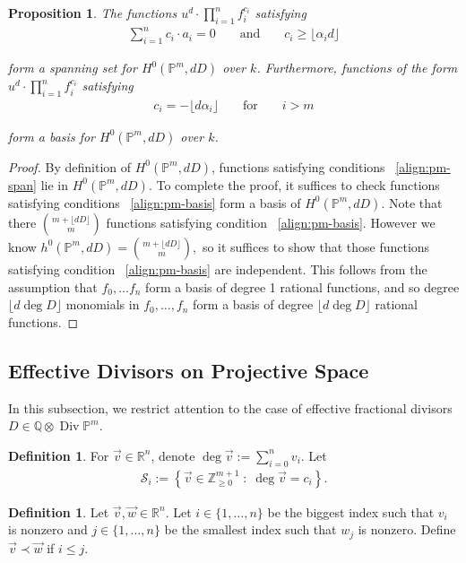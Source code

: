\documentclass{amsart}
\theoremstyle{plain}
\newtheorem{prop}[thm]{Proposition}
\theoremstyle{definition}
\newtheorem{defn}[thm]{Definition}
\theoremstyle{remark}
\numberwithin{equation}{section}
\newcommand\ssec{\subsection}
\newcommand\br{{\mathbb R}}
\newcommand\bq{{\mathbb Q}}
\newcommand\bp{{\mathbb P}}
\newcommand\bz{{\mathbb Z}}
\DeclareMathOperator\di{Div}
\newcommand\bida{a}
\newcommand\mss{\mathscr{S}}
\begin{document}
\begin{prop}
\label{prop:pm-span-and-basis}
The functions $u^d \cdot \prod_{i=1}^n f_i^{c_i}$ satisfying
\begin{align}
\label{align:pm-span}
\sum_{i=1}^{n} c_i \cdot \bida_i = 0 && \text{ and } &&c_i \geq \lfloor \alpha_i d\rfloor	
\end{align}

\noindent
form a spanning set for $H^0(\bp^m, dD)$ over $k$. Furthermore, functions 
of the form $u^d \cdot \prod_{i=1}^n f_i^{c_i}$ satisfying
\begin{align}
\label{align:pm-basis}
c_i = -\lfloor d\alpha_i \rfloor && \text{ for } && i > m
\end{align}

\noindent
form a basis for $H^0(\bp^m, dD)$ over $k$.
\end{prop}

\begin{proof}
By definition of $H^0(\bp^m,dD)$, functions satisfying conditions 
~\eqref{align:pm-span} lie in $H^0(\bp^m,dD)$. To complete the proof, it suffices to check functions satisfying conditions ~\eqref{align:pm-basis} form a basis of $H^0(\bp^m,dD)$. Note that there $\binom{m+ \lfloor dD \rfloor }{m}$ functions satisfying condition ~\eqref{align:pm-basis}. However we know $h^0(\bp^m,dD) = \binom{m+ \lfloor dD \rfloor }{m},$ so it suffices to show that those functions satisfying condition ~\eqref{align:pm-basis} are independent. This follows from the assumption that $f_0,\ldots f_n$ form a basis of degree 1 rational functions, and so degree $\lfloor d \deg D \rfloor $ monomials in $f_0,\ldots, f_n$ form a basis of degree $\lfloor d \deg D \rfloor $ rational functions.
\end{proof}

\ssec{Effective Divisors on Projective Space}
\label{ssec:proj-one-point}

In this subsection, we restrict attention to the case of effective fractional divisors $D \in \bq \otimes \di \bp^m$.

\begin{defn}
\label{defn:vec-sum}
For $\vec{v} \in \br^n$, denote $\deg \vec{v} := \sum_{i = 0}
^n v_i$.
Let 
\begin{align*}
	\mss_i := \left \{\vec{v} \in \bz_{\geq 0}^{m + 1} \; : \;
\deg \vec v = c_i \right\}.	
\end{align*}
\end{defn}

\begin{defn}
\label{defn:vec-order}
Let $\vec{v}, \vec{w} \in \br^n$. Let $i \in \{1,\ldots, n\}$
be the biggest index such that $v_i$ is nonzero
and $j \in \{1,\ldots, n\}$ be the smallest index such that $w_j$ is
nonzero. Define $\vec{v} \prec \vec{w}$ if $i \leq j$.
\end{defn}
\end{document}
